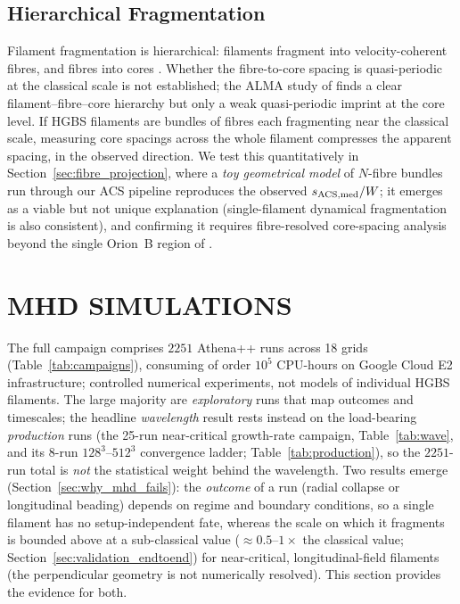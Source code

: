 \documentclass[usenatbib,twoside,twocolumn]{mnras}
\begin{document}
\subsection{Hierarchical Fragmentation}

Filament fragmentation is hierarchical: filaments fragment into velocity-coherent fibres, and fibres into cores \citep{Hacar2013,Hacar2018,Yang2024}. Whether the fibre-to-core spacing is quasi-periodic at the classical scale is not established; the ALMA study of \citet{Yang2024} finds a clear filament--fibre--core hierarchy but only a weak quasi-periodic imprint at the core level. If HGBS filaments are bundles of fibres each fragmenting near the classical scale, measuring core spacings across the whole filament compresses the apparent spacing, in the observed direction. We test this quantitatively in Section~\ref{sec:fibre_projection}, where a \emph{toy geometrical model} of $N$-fibre bundles run through our ACS pipeline reproduces the observed $s_{\rm ACS,med}/W$; it emerges as a viable but not unique explanation (single-filament dynamical fragmentation is also consistent), and confirming it requires fibre-resolved core-spacing analysis beyond the single Orion~B region of \citet{Yang2024}.

\section{MHD SIMULATIONS}

The full campaign comprises $2251$ Athena++ runs across 18 grids (Table~\ref{tab:campaigns}), consuming of order $10^5$ CPU-hours on Google Cloud E2 infrastructure; controlled numerical experiments, not models of individual HGBS filaments. The large majority are \emph{exploratory} runs that map outcomes and timescales; the headline \emph{wavelength} result rests instead on the load-bearing \emph{production} runs (the 25-run near-critical growth-rate campaign, Table~\ref{tab:wave}, and its 8-run $128^3$--$512^3$ convergence ladder; Table~\ref{tab:production}), so the $2251$-run total is \emph{not} the statistical weight behind the wavelength. Two results emerge (Section~\ref{sec:why_mhd_fails}): the \emph{outcome} of a run (radial collapse or longitudinal beading) depends on regime and boundary conditions, so a single filament has no setup-independent fate, whereas the scale on which it fragments is bounded above at a sub-classical value ($\approx0.5$--$1\times$ the classical value; Section~\ref{sec:validation_endtoend}) for near-critical, longitudinal-field filaments (the perpendicular geometry is not numerically resolved). This section provides the evidence for both.
\end{document}
